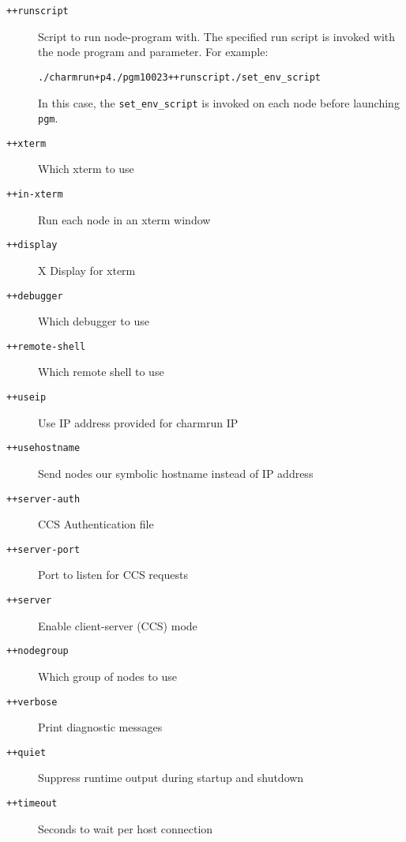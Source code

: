 \begin{description}
\item[{\tt ++runscript}]        Script to run node-program with. The specified run script is invoked with the node program and parameter. For example:

\begin{alltt}
./charmrun +p4 ./pgm 100 2 3 ++runscript ./set\_env\_script
\end{alltt}

In this case, the {\tt set\_env\_script} is invoked on each node before launching {\tt pgm}.

\item[{\tt ++xterm}]            Which xterm to use

\item[{\tt ++in-xterm}]         Run each node in an xterm window

\item[{\tt ++display}]          X Display for xterm

\item[{\tt ++debugger}]         Which debugger to use

\item[{\tt ++remote-shell}]     Which remote shell to use

\item[{\tt ++useip}]            Use IP address provided for charmrun IP

\item[{\tt ++usehostname}]      Send nodes our symbolic hostname instead of IP address



\item[{\tt ++server-auth}]      CCS Authentication file

\item[{\tt ++server-port}]      Port to listen for CCS requests

\item[{\tt ++server}]           Enable client-server (CCS) mode

\item[{\tt ++nodegroup}]        Which group of nodes to use

\item[{\tt ++verbose}]          Print diagnostic messages

\item[{\tt ++quiet}]            Suppress runtime output during startup and shutdown

\item[{\tt ++timeout}]          Seconds to wait per host connection

\end{description}

